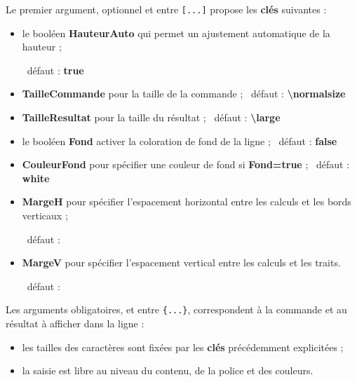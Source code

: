 \documentclass[french,a4paper,11pt]{article}
\newcommand\Cle[1]{{\bfseries\sffamily\textlangle #1\textrangle}}
\begin{document}
\begin{tipblock}
Le premier argument, optionnel et entre \texttt{[...]} propose les \Cle{clés} suivantes :

\begin{itemize}
	\item le booléen \Cle{HauteurAuto} qui permet un ajustement automatique de la hauteur ;
	
	\hfill~défaut : \Cle{true}
	\item \Cle{TailleCommande} pour la taille de la commande ; \hfill~défaut : \Cle{\textbackslash normalsize}
	\item \Cle{TailleResultat} pour la taille du résultat ; \hfill~défaut : \Cle{\textbackslash large}
	\item le booléen \Cle{Fond} activer la coloration de fond de la ligne ; \hfill~défaut : \Cle{false}
	\item \Cle{CouleurFond} pour spécifier une couleur de fond si \Cle{Fond=true} ; \hfill~défaut : \Cle{white}
	\item \Cle{MargeH} pour spécifier l'espacement horizontal entre les calculs et les bords verticaux ;
	
	\hfill~défaut : \Cle{0.2}
	\item \Cle{MargeV} pour spécifier l'espacement vertical entre les calculs et les traits.
	
	\hfill~défaut : \Cle{6pt}
\end{itemize}
\vspace*{-\baselineskip}\leavevmode
\end{tipblock}

\begin{tipblock}
Les arguments obligatoires, et entre \texttt{\{...\}}, correspondent à la commande et au résultat à afficher dans la ligne :

\begin{itemize}
	\item les tailles des caractères sont fixées par les \Cle{clés} précédemment explicitées ;
	\item la saisie est libre au niveau du contenu, de la police et des couleurs.
\end{itemize}
\vspace*{-\baselineskip}\leavevmode
\end{tipblock}
\end{document}
